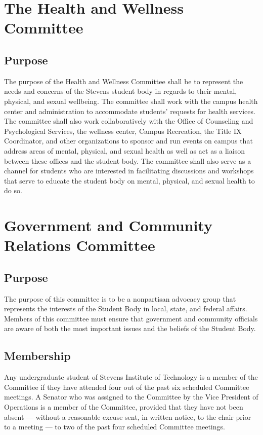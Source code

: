 \documentclass[12pt]{scrreprt}
\begin{document}
\section{The Health and Wellness Committee}

\subsection{Purpose}
The purpose of the Health and Wellness Committee shall be to represent the needs and
concerns of the Stevens student body in regards to their mental, physical, and sexual
wellbeing. The committee shall work with the campus health center and administration to
accommodate students’ requests for health services. The committee shall also work
collaboratively with the Office of Counseling and Psychological Services, the wellness
center, Campus Recreation, the Title IX Coordinator, and other organizations to sponsor
and run events on campus that address areas of mental, physical, and sexual health as
well as act as a liaison between these offices and the student body. The committee shall also serve as a channel for students who are interested in facilitating discussions and workshops that serve to educate the student body on mental, physical, and sexual health to do so. 
\section{Government and Community Relations Committee}
\subsection{Purpose}
The purpose of this committee is to be a nonpartisan advocacy group that represents
the interests of the Student Body in local, state, and federal affairs. Members of this
committee must ensure that government and community officials are aware of both the
most important issues and the beliefs of the Student Body.

\subsection{Membership}
Any undergraduate student of Stevens Institute of Technology is a member of the
Committee if they have attended four out of the past six scheduled Committee
meetings. A Senator who was assigned to the Committee by the Vice President of
Operations is a member of the Committee, provided that they have not been absent —
without a reasonable excuse sent, in written notice, to the chair prior to a meeting — to
two of the past four scheduled Committee meetings.
\end{document}
